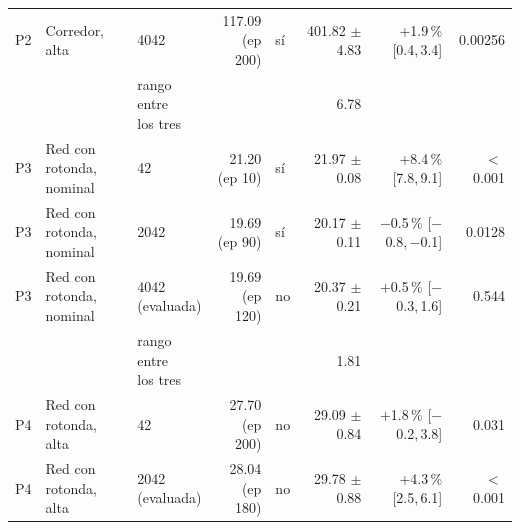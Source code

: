 \begin{table}[H]
\begin{tabular}{lllrlrrr}
P2 & \makecell[l]{Corredor,\\{}alta} & 4042 & \makecell[r]{117.09\\{}(ep 200)} & sí & \makecell[r]{401.82\\{}$\pm$ 4.83} & \makecell[r]{+1.9\,\%\\{}[0.4,\,3.4]} & 0.00256 \\
 & & \makecell[l]{rango entre\\{}los tres} & & & 6.78 & & \\
P3 & \makecell[l]{Red con rotonda,\\{}nominal} & 42 & \makecell[r]{21.20\\{}(ep 10)} & sí & \makecell[r]{21.97\\{}$\pm$ 0.08} & \makecell[r]{+8.4\,\%\\{}[7.8,\,9.1]} & $<$\,0.001 \\
P3 & \makecell[l]{Red con rotonda,\\{}nominal} & 2042 & \makecell[r]{19.69\\{}(ep 90)} & sí & \makecell[r]{20.17\\{}$\pm$ 0.11} & \makecell[r]{$-$0.5\,\%\\{}[$-$0.8,\,$-$0.1]} & 0.0128 \\
P3 & \makecell[l]{Red con rotonda,\\{}nominal} & \makecell[l]{4042\\{}(evaluada)} & \makecell[r]{19.69\\{}(ep 120)} & no & \makecell[r]{20.37\\{}$\pm$ 0.21} & \makecell[r]{+0.5\,\%\\{}[$-$0.3,\,1.6]} & 0.544 \\
 & & \makecell[l]{rango entre\\{}los tres} & & & 1.81 & & \\
P4 & \makecell[l]{Red con rotonda,\\{}alta} & 42 & \makecell[r]{27.70\\{}(ep 200)} & no & \makecell[r]{29.09\\{}$\pm$ 0.84} & \makecell[r]{+1.8\,\%\\{}[$-$0.2,\,3.8]} & 0.031 \\
P4 & \makecell[l]{Red con rotonda,\\{}alta} & \makecell[l]{2042\\{}(evaluada)} & \makecell[r]{28.04\\{}(ep 180)} & no & \makecell[r]{29.78\\{}$\pm$ 0.88} & \makecell[r]{+4.3\,\%\\{}[2.5,\,6.1]} & $<$\,0.001 \\

\end{tabular}
\end{table}
